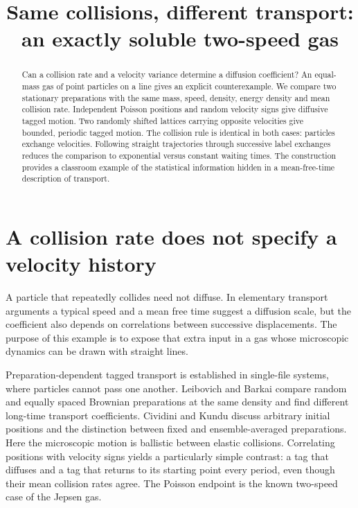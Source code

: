 \documentclass[11pt,a4paper]{article}
\title{Same collisions, different transport:\\an exactly soluble two-speed gas}
\author{}
\date{}
\begin{document}
\maketitle
\begin{abstract}
Can a collision rate and a velocity variance determine a diffusion coefficient?
An equal-mass gas of point particles on a line gives an explicit counterexample.
We compare two stationary preparations with the same mass, speed, density,
energy density and mean collision rate. Independent Poisson positions and
random velocity signs give diffusive tagged motion. Two randomly shifted
lattices carrying opposite velocities give bounded, periodic tagged motion.
The collision rule is identical in both cases: particles exchange velocities.
Following straight trajectories through successive label exchanges reduces the
comparison to exponential versus constant waiting times. The construction
provides a classroom example of the statistical information hidden in a
mean-free-time description of transport.
\end{abstract}

\section{A collision rate does not specify a velocity history}
A particle that repeatedly collides need not diffuse. In elementary transport
arguments a typical speed and a mean free time suggest a diffusion scale, but
the coefficient also depends on correlations between successive displacements.
The purpose of this example is to expose that extra input in a gas whose
microscopic dynamics can be drawn with straight lines.

Preparation-dependent tagged transport is established in single-file systems,
where particles cannot pass one another. Leibovich and Barkai compare random
and equally spaced Brownian preparations at the same density and find different
long-time transport coefficients.\cite{LeibovichBarkai2013}
Cividini and Kundu discuss arbitrary initial positions and the distinction
between fixed and ensemble-averaged preparations.\cite{CividiniKundu2017}
Here the microscopic motion is ballistic between elastic collisions. Correlating
positions with velocity signs yields a particularly simple contrast: a tag
that diffuses and a tag that returns to its starting point every period, even
though their mean collision rates agree. The Poisson endpoint is the known
two-speed case of the Jepsen gas.\cite{BalakrishnanBenaVanDenBroeck2002}
\end{document}
